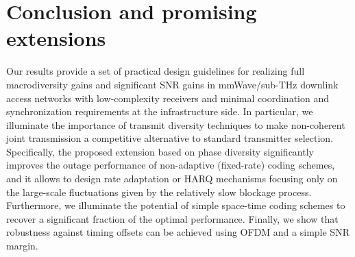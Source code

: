 \documentclass[10pt,journal,a4paper]{IEEEtran}
\newcommand{\eqdef}{:=}
\newcommand{\E}{\mathsf{E}}		%
\renewcommand{\P}{\mathsf{Pr}} 			%
\begin{document}
%

\section{Conclusion and promising extensions}
\label{sec:conclusion}
Our results provide a set of practical design guidelines for realizing full macrodiversity gains and significant SNR gains in mmWave/sub-THz downlink access networks with low-complexity receivers and minimal coordination and synchronization requirements at the infrastructure side. In particular, we illuminate the importance of transmit diversity techniques to make non-coherent joint transmission a competitive alternative to standard transmitter selection. Specifically, the proposed extension based on phase diversity significantly improves the outage performance of non-adaptive (fixed-rate) coding schemes, and it allows to design rate adaptation or HARQ mechanisms focusing only on the large-scale fluctuations given by the relatively slow blockage process. Furthermore, we illuminate the potential of simple space-time coding schemes to recover a significant fraction of the optimal performance. Finally, we show that robustness against timing offsets can be achieved using OFDM and a simple SNR margin.
\end{document}
